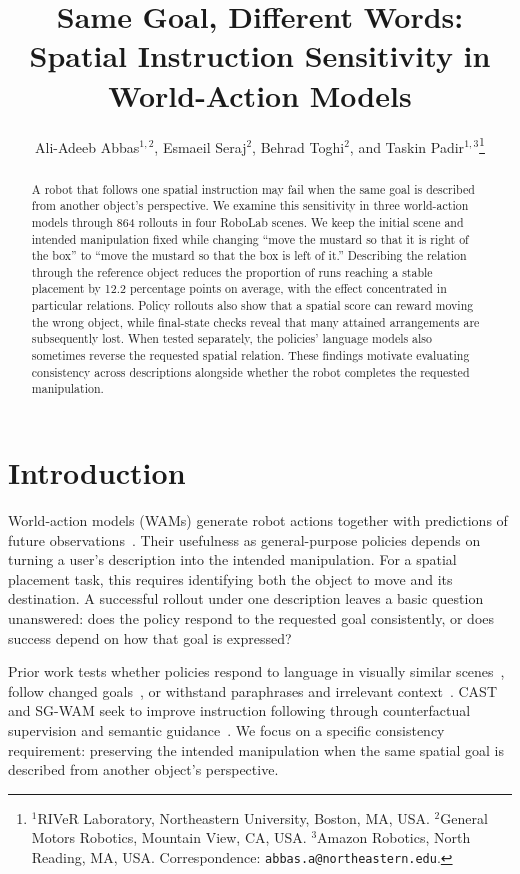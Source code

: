 \documentclass{article}
\title{Same Goal, Different Words:\\Spatial Instruction Sensitivity in World-Action Models}
\author{Ali-Adeeb Abbas$^{1,2}$, Esmaeil Seraj$^2$, Behrad Toghi$^2$, and Taskin Padir$^{1,3}$\thanks{$^1$RIVeR Laboratory, Northeastern University, Boston, MA, USA. $^2$General Motors Robotics, Mountain View, CA, USA. $^3$Amazon Robotics, North Reading, MA, USA. Correspondence: \texttt{abbas.a@northeastern.edu}.}}
\begin{document}
\maketitle
\begin{abstract}
A robot that follows one spatial instruction may fail when the same goal is described from another object's perspective. We examine this sensitivity in three world-action models through 864 rollouts in four RoboLab scenes. We keep the initial scene and intended manipulation fixed while changing ``move the mustard so that it is right of the box'' to ``move the mustard so that the box is left of it.'' Describing the relation through the reference object reduces the proportion of runs reaching a stable placement by 12.2 percentage points on average, with the effect concentrated in particular relations. Policy rollouts also show that a spatial score can reward moving the wrong object, while final-state checks reveal that many attained arrangements are subsequently lost. When tested separately, the policies' language models also sometimes reverse the requested spatial relation. These findings motivate evaluating consistency across descriptions alongside whether the robot completes the requested manipulation.

\end{abstract}

\setlength{\parskip}{2.5pt}
\section{Introduction}
World-action models (WAMs) generate robot actions together with predictions of future observations~\citep{kim2026cosmospolicy}. Their usefulness as general-purpose policies depends on turning a user's description into the intended manipulation. For a spatial placement task, this requires identifying both the object to move and its destination. A successful rollout under one description leaves a basic question unanswered: does the policy respond to the requested goal consistently, or does success depend on how that goal is expressed?

Prior work tests whether policies respond to language in visually similar scenes~\citep{tri2025lbm}, follow changed goals~\citep{fang2026counterfactual}, or withstand paraphrases and irrelevant context~\citep{fei2026liberoplus,kim2026liberopara,moskalenko2026bring}. CAST and SG-WAM seek to improve instruction following through counterfactual supervision and semantic guidance~\citep{glossop2025cast,he2026sgwam}. We focus on a specific consistency requirement: preserving the intended manipulation when the same spatial goal is described from another object's perspective.
\end{document}
